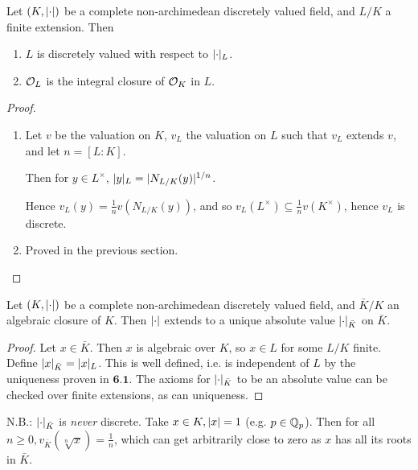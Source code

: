 \documentclass[10pt,a4paper]{article}
\begin{document}
\begin{corollary}
  Let $(K, \lvert\cdot\rvert)$ be a complete non-archimedean discretely valued field, and $L/K$ a finite extension. Then
  \begin{enumerate}
    \item $L$ is discretely valued with respect to $\lvert\cdot\rvert_L$.
    \item $\mathcal{O}_L$ is the integral closure of $\mathcal{O}_K$ in $L$.
  \end{enumerate}
\end{corollary}
\begin{proof}\hspace*{0cm}
  \begin{enumerate}[label=\textit{\arabic*.}]
    \item Let $v$ be the valuation on $K$, $v_L$ the valuation on $L$ such that $v_L$ extends $v$, and let $n = [L:K]$.

    Then for $y \in L^\times$, $\lvert y\rvert_L = \lvert N_{L/K}(y)\rvert^{1/n}$.

    Hence $v_L(y) = \frac{1}{n}v(N_{L/K}(y))$, and so $v_L(L^\times) \subseteq \frac{1}{n}v(K^\times)$, hence $v_L$ is discrete.

    \item Proved in the previous section.
\end{enumerate}
\end{proof}
\begin{corollary}
  Let $(K, \lvert\cdot\rvert)$ be a complete non-archimedean discretely valued field, and $\bar{K}/K$ an algebraic closure of $K$. Then $\lvert\cdot\rvert$ extends to a unique absolute value $\lvert\cdot\rvert_{\bar{K}}$ on $\bar{K}$.
\end{corollary}
\begin{proof}
  Let $x \in \bar{K}$. Then $x$ is algebraic over $K$, so $x \in L$ for some $L/K$ finite. Define $\lvert x\rvert_{\bar{K}} = \lvert x\rvert_L$. This is well defined, i.e. is independent of $L$ by the uniqueness proven in $\textbf{6.1}$. The axioms for $\lvert\cdot\rvert_{\bar{K}}$ to be an absolute value can be checked over finite extensions, as can uniqueness.
\end{proof}
\textsc{N.B.:} $\lvert\cdot\rvert_{\bar{K}}$ is \textit{never} discrete. Take $x \in K, \lvert x\rvert = 1$ (e.g. $p \in \mathbb{Q}_p$). Then for all $n \geq 0, v_{\bar{K}}(\sqrt[n]{x}) = \frac{1}{n}$, which can get arbitrarily close to zero as $x$ has all its roots in $\bar{K}$.
\end{document}
